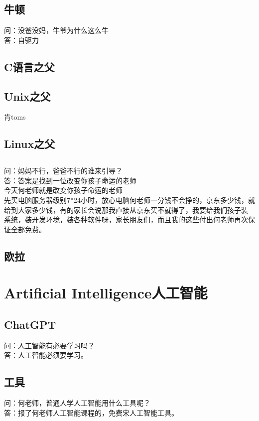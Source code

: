 \documentclass[12pt,twiside,a4paper]{ctexbook}
\numberwithin{chapter}{part}
\begin{document}
\section{牛顿}
问：没爸没妈，牛爷为什么这么牛\\
答：自驱力

\section{C语言之父}

\section{Unix之父}
肯toms

\section{Linux之父}

\section{}
问：妈妈不行，爸爸不行的谁来引导？\\
答：答案是找到一位改变你孩子命运的老师\\
今天何老师就是改变你孩子命运的老师\\
先买电脑服务器级别7*24小时，放心电脑何老师一分钱不会挣的，京东多少钱，就给到大家多少钱，有的家长会说那我直接从京东买不就得了，我要给我们孩子装
系统，装开发环境，装各种软件呀，家长朋友们，而且我的这些付出何老师再次保证全部免费。\\

\section{欧拉}

\chapter{Artificial Intelligence人工智能}
\section{ChatGPT}
问：人工智能有必要学习吗？\\
答：人工智能必须要学习。

\section{工具}
问：何老师，普通人学人工智能用什么工具呢？\\
答：报了何老师人工智能课程的，免费宋人工智能工具。
\end{document}
